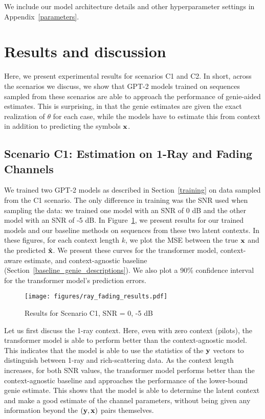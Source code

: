 \documentclass[journal,letterpaper,onecolumn]{IEEEtran}
\begin{document}
We include our model architecture details and other hyperparameter settings in Appendix~\ref{parameters}.

\section{Results and discussion}

Here, we present experimental results for scenarios C1 and C2. In short, across the scenarios we discuss, we show that GPT-2 models trained on sequences sampled from these scenarios are able to approach the performance of genie-aided estimates. This is surprising, in that the genie estimates are given the exact realization of $\theta$ for each case, while the models have to estimate this from context in addition to predicting the symbols ${\mathbf{x}}$.

\subsection{Scenario C1: Estimation on 1-Ray and Fading Channels}
We trained two GPT-2 models as described in Section~\ref{training} on data sampled from the C1 scenario. The only difference in training was the SNR used when sampling the data: we trained one model with an SNR of 0 dB and the other model with an SNR of -5 dB. In Figure~\ref{fig:ray_fading_results}, we present results for our trained models and our baseline methods on sequences from these two latent contexts. In these figures, for each context length $k$, we plot the MSE between the true ${\mathbf{x}}$ and the predicted $\hat{{\mathbf{x}}}$. 
We present these curves for the transformer model, context-aware estimate, and context-agnostic baseline (Section~\ref{baseline_genie_descriptions}).
We also plot a 90\% confidence interval for the transformer model's prediction errors.

\begin{figure}
    \centering
    \texttt{[image: figures/ray\_fading\_results.pdf]}
    \caption{Results for Scenario C1, SNR = 0, -5 dB}
    \label{fig:ray_fading_results}
\end{figure}

Let us first discuss the 1-ray context. Here, even with zero context (pilots), the transformer model is able to perform better than the context-agnostic model. This indicates that the model is able to use the statistics of the ${\mathbf{y}}$ vectors to distinguish between 1-ray and rich-scattering data. As the context length increases, for both SNR values, the transformer model performs better than the context-agnostic baseline and approaches the performance of the lower-bound genie estimate. This shows that the model is able to determine the latent context and make a good estimate of the channel parameters, without being given any information beyond the $({\mathbf{y}}, {\mathbf{x}})$ pairs themselves.
\end{document}
